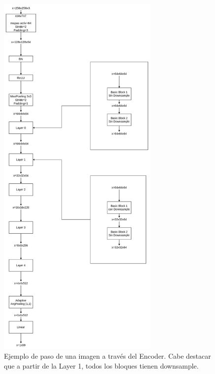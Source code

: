             \begin{figure}[H]
                \centering
                \includegraphics[width=0.7\textwidth]{img/3FabRec-Page-2.drawio.png}
                \caption{Ejemplo de paso de una imagen a través del Encoder. Cabe destacar que a partir de la Layer 1, todos los bloques tienen downsample.}
                \label{fig:Paso_encoder}
            \end{figure}


